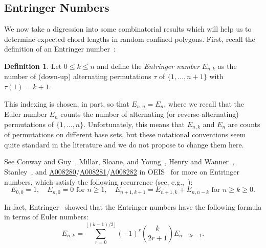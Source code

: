 \documentclass{article}
\theoremstyle{definition}
\newtheorem{definition}[theorem]{Definition}
\newcommand{\seqnum}[1]{\href{http://oeis.org/#1}{#1}}
\newcommand{\ent}[2]{E_{#1,#2}}
\begin{document}
\subsection{Entringer Numbers} 
\label{sub:entringer numbers}


We now take a digression into some combinatorial results which will help us to determine expected chord lengths in random confined polygons. First, recall the definition of an Entringer number~\cite{entringerCombinatorialInterpretationEuler1966,seidelEinfacheEntstehungsweiseBernoullischen1877,kempnerShapePolynomialCurves1933,poupardNouvellesSignificationsEnumeratives1982,arnoldBernoulliEulerUpdownNumbers1991}:

\begin{definition}\label{def: entringer}
	Let $0 \leq k \leq n$ and define the \emph{Entringer number} $\ent{n}{k}$ as the number of (down-up) alternating permutations $\tau$ of $\{1, \dots, n+1\}$ with $\tau(1) = k+1$.
\end{definition}

This indexing is chosen, in part, so that $E_{n,n} = E_n$, where we recall that the Euler number $E_n$ counts the number of alternating (or reverse-alternating) permutations of $\{1,\dots, n\}$. Unfortunately, this means that $E_{n,k}$ and $E_n$ are counts of permutations on different base sets, but these notational conventions seem quite standard in the literature and we do not propose to change them here. 

See Conway and Guy~\cite[p.~110]{conwayBookNumbers1996}, Millar, Sloane, and Young~\cite{millarNewOperationSequences1996}, Henry and Wanner~\cite{henryZigzagsBurgiBernoulli2019}, Stanley~\cite[Section~2]{stanleySurveyAlternatingPermutations2010}, and \seqnum{A008280}/\seqnum{A008281}/\seqnum{A008282} in OEIS~\cite{oeis} for more on Entringer numbers, which satisfy the following recurrence (see, e.g.,~\cite[Exercise~1.141]{stanleyEnumerativeCombinatorics2011}):
\begin{equation}\label{eq:Entringer recurrence}
	\ent{0}{0} = 1, \quad \ent{n}{0} = 0 \text{ for } n \geq 1, \quad \ent{n+1}{k+1} = \ent{n+1}{k} + \ent{n}{n-k}\text{ for } n \geq k \geq 0.
\end{equation}

In fact, Entringer~\cite{entringerCombinatorialInterpretationEuler1966} showed that the Entringer numbers have the following formula in terms of Euler numbers:
\begin{equation}\label{eq:entringer formula}
	\ent{n}{k} = \sum_{r=0}^{\lfloor (k-1)/2 \rfloor}(-1)^r \binom{k}{2r+1} E_{n-2r-1}.
\end{equation}
\end{document}

